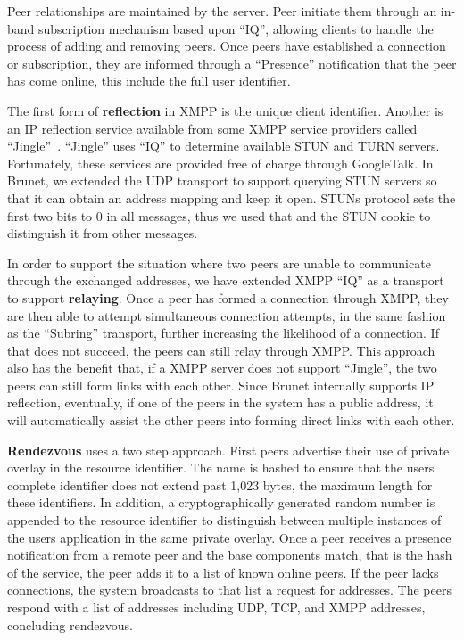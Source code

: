 \documentclass[conference]{IEEEtran}
\begin{document}
Peer relationships are maintained by the server.  Peer initiate them through an
in-band subscription mechanism based upon ``IQ'', allowing clients to handle
the process of adding and removing peers.  Once peers have established a
connection or subscription, they are informed through a ``Presence''
notification that the peer has come online, this include the full user
identifier.

The first form of \textbf{reflection} in XMPP is the unique client identifier.
Another is an IP reflection service available from some XMPP service providers
called ``Jingle''~\cite{jingle}.  ``Jingle'' uses ``IQ'' to determine available
STUN and TURN servers.  Fortunately, these services are provided free of charge
through GoogleTalk.  In Brunet, we extended the UDP transport to support
querying STUN servers so that it can obtain an address mapping and keep it
open.  STUNs protocol sets the first two bits to 0 in all messages, thus we
used that and the STUN cookie to distinguish it from other messages.

In order to support the situation where two peers are unable to communicate
through the exchanged addresses, we have extended XMPP ``IQ'' as a transport to
support \textbf{relaying}.  Once a peer has formed a connection through XMPP,
they are then able to attempt simultaneous connection attempts, in the same
fashion as the ``Subring'' transport, further increasing the likelihood of a
connection.  If that does not succeed, the peers can still relay through XMPP.
This approach also has the benefit that, if a XMPP server does not support
``Jingle'', the two peers can still form links with each other.  Since Brunet
internally supports IP reflection, eventually, if one of the peers in the system
has a public address, it will automatically assist the other peers into forming
direct links with each other.

\textbf{Rendezvous} uses a two step approach.  First peers advertise their use
of private overlay in the resource identifier.  The name is hashed to ensure
that the users complete identifier does not extend past 1,023 bytes, the
maximum length for these identifiers.  In addition, a cryptographically
generated random number is appended to the resource identifier to distinguish
between multiple instances of the users application in the same private
overlay.  Once a peer receives a presence notification from a remote peer and
the base components match, that is the hash of the service, the peer adds it to
a list of known online peers.  If the peer lacks connections, the system
broadcasts to that list a request for addresses.  The peers respond with a list
of addresses including UDP, TCP, and XMPP addresses, concluding rendezvous.
\end{document}
